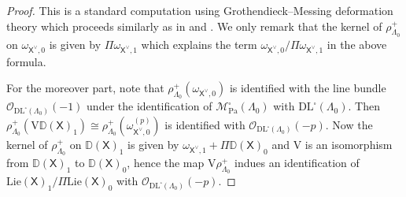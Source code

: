 \documentclass[10pt]{amsart}
\numberwithin{equation}{section}
\newtheorem{lemma}[equation]{Lemma}
\theoremstyle{definition}
\def\Lie{\mathrm{Lie}}
\def\Pa{\mathrm{Pa}}
\def\calM{\mathcal{M}}
\def\calO{\mathcal{O}}
\def\calT{\mathcal{T}}
\def\DD{\mathbb{D}}
\def\sfX{\mathsf{X}}
\def\rmD{\mathrm{D}}
\def\rmV{\mathrm{V}}
\begin{document}
\begin{proof}
This is a standard computation using  Grothendieck--Messing deformation theory which proceeds similarly as in \cite[Theorem 4.3.5]{LTXZZ} and \cite[Theorem 6.37]{Sweeting}. We only remark that the kernel of $\rho^{+}_{\Lambda_{0}}$ on $\omega_{\sfX^{\vee},0}$ is given by $\Pi \omega_{\sfX^{\vee},1}$ which explains the term $\omega_{\sfX^{\vee},0}/\Pi\omega_{\sfX^{\vee},1}$ in the above formula.

For the moreover part, note that $\rho^{+}_{\Lambda_{0}}(\omega_{\sfX^{\vee},0})$ is identified with the line bundle $\calO_{\mathrm{DL}^{\square}(\Lambda_{0})}(-1)$ under the identification of $\calM^{\square}_{\Pa}(\Lambda_{0})$ with $\mathrm{DL}^{\square}(\Lambda_{0})$. Then $\rho^{+}_{\Lambda_{0}}(\rmV\DD(\sfX)_{1})\cong \rho^{+}_{\Lambda_{0}}(\omega^{(p)}_{\sfX^{\vee},0})$ is identified with $\calO_{\mathrm{DL}^{\square}(\Lambda_{0})}(-p)$. Now the kernel of $\rho^{+}_{\Lambda_{0}}$ on $\DD(\sfX)_{1}$ is given by $\omega_{\sfX^{\vee}, 1}+\Pi\DD(\sfX)_{0}$ and $\rmV$ is an isomorphism from $\DD(\sfX)_{1}$ to $\DD(\sfX)_{0}$, hence the map $\rmV\rho^{+}_{\Lambda_{0}}$ indues an identification of $\Lie(\sfX)_{1}/\Pi\Lie(\sfX)_{0}$ with $\calO_{\mathrm{DL}^{\square}(\Lambda_{0})}(-p)$.
\end{proof}

\end{document}
